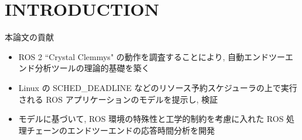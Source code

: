 
\section{INTRODUCTION}
\label{sec: introduction}


\begin{frame}{本論文の貢献}
    \begin{itemize}
        \item ROS 2 ``Crystal Clemmys" の動作を調査することにより, 自動エンドツーエンド分析ツールの理論的基礎を築く
        \item Linux の SCHED\_DEADLINE などのリソース予約スケジューラの上で実行される ROS アプリケーションのモデルを提示し, 検証
        \item モデルに基づいて, ROS 環境の特殊性と工学的制約を考慮に入れた ROS 処理チェーンのエンドツーエンドの応答時間分析を開発
    \end{itemize}
\end{frame}
